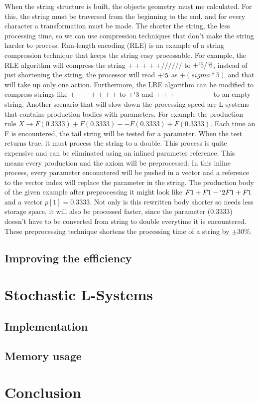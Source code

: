 \documentclass[11pt,a4paper]{article}
\begin{document}
When the string structure is built, the objects geometry must me calculated. For this, the string must be traversed from the beginning to the end, and for every character a transformation must be made. The shorter the string, the less processing time, so we can use compression techniques that don't make the string harder to process. Run-length encoding (RLE) is an example of a string compression technique that keeps the string easy processable. For example, the RLE algorithm will compress the string $+++++//////$ to $+`5/`6$, instead of just shortening the string, the processor will read $+`5$ as $+(sigma*5)$ and that will take up only one action. Furthermore, the LRE algorithm can be modified to compress strings like $+--++++$ to $+`3$ and $+++--+--$ to an empty string.
Another scenario that will slow down the processing speed are L-systems that contains production bodies with parameters. For example the production rule $X \rightarrow F(0.3333)+F(0.3333)--F(0.3333)+F(0.3333)$. Each time an F is encountered, the tail string will be tested for a parameter. When the test returns true, it must process the string to a double. This process is quite expensive and can be eliminated using an inlined parameter reference. This means every production and the axiom will be preprocessed. In this inline process, every parameter encountered will be pushed in a vector and a reference to the vector index will replace the parameter in the string. The production body of the given example after preprocessing it might look like $F\tilde{ } 1+F\tilde{ } 1-`2F\tilde{ } 1+F\tilde{ } 1$ and a vector $p[1]=0.3333$. Not only is this rewritten body shorter so needs less storage space, it will also be processed faster, since the parameter (0.3333) doesn't have to be converted from string to double everytime it is encountered.
These preprocessing technique shortens the processing time of a string by $\pm 30\%$.

\subsection{Improving the efficiency}


\section{Stochastic L-Systems} %
\subsection{Implementation}



\subsection{Memory usage}


\section{Conclusion}

\newpage
\begin{appendix}
\listoffigures
\end{appendix}
\end{document}
